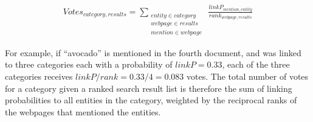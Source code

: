 \begin{gather*}
Votes_{category,results} =
\sum_{\substack{entity \in category \\ webpage \in results\\ mention \in webpage}} \
\frac{linkP_{mention,entity}}{rank_{webpage,results}}
\end{gather*}


For example, if ``avocado'' is mentioned in the fourth document, and was linked to three categories each with a probability of $linkP = 0.33$, each of the three categories receives $linkP/rank = 0.33/4 = 0.083$ votes. The total number of votes for a category given a ranked search result list is therefore the sum of linking probabilities to all entities in the category, weighted by the reciprocal ranks of the webpages that mentioned the entities.



